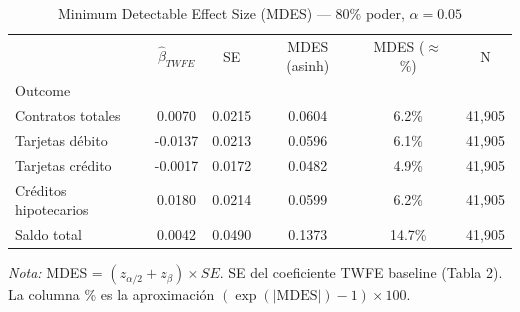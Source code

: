 \begin{table}[htbp]
\centering
\small
\caption{Minimum Detectable Effect Size (MDES) — 80\% poder, $\alpha = 0.05$}
\label{tab:mdes}
\begin{tabular}{lccccc}
\toprule
 & $\hat{\beta}_{TWFE}$ & SE & MDES (asinh) & MDES ($\approx$ \%) & N \\
Outcome &  &  &  &  &  \\
\midrule
Contratos totales & 0.0070 & 0.0215 & 0.0604 & 6.2\% & 41,905 \\
Tarjetas débito & -0.0137 & 0.0213 & 0.0596 & 6.1\% & 41,905 \\
Tarjetas crédito & -0.0017 & 0.0172 & 0.0482 & 4.9\% & 41,905 \\
Créditos hipotecarios & 0.0180 & 0.0214 & 0.0599 & 6.2\% & 41,905 \\
Saldo total & 0.0042 & 0.0490 & 0.1373 & 14.7\% & 41,905 \\
\bottomrule
\end{tabular}
\vspace{2mm}
\parbox{\textwidth}{\footnotesize \textit{Nota:} MDES = $(z_{\alpha/2} + z_{\beta}) \times SE$. SE del coeficiente TWFE baseline (Tabla 2). La columna \% es la aproximación $(\exp(|\text{MDES}|) - 1) \times 100$.}
\end{table}